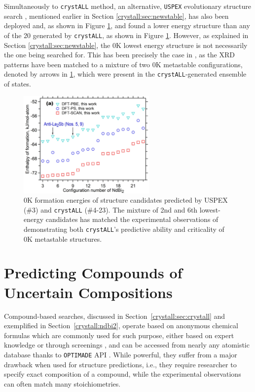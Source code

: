 Simultaneously to \texttt{crystALL} method, an alternative, \texttt{USPEX} evolutionary structure search \cite{Lyakhov2013NewUSPEX}, mentioned earlier in Section \ref{crystall:sec:newstable}, has also been deployed and, as shown in Figure \ref{crystall:fig:ndbi2dft}, and found a lower energy structure than any of the 20 generated by \texttt{crystALL}, as shown in Figure \ref{crystall:fig:ndbi2dft}. However, as explained in Section \ref{crystall:sec:newstable}, the 0K lowest energy structure is not necessarily the one being searched for. This has been precisely the case in \citet{Im2022ThermodynamicModeling}, as the XRD patterns have been matched to a mixture of two 0K metastable configurations, denoted by arrows in \ref{crystall:fig:ndbi2dft}, which were present in the \texttt{crystALL}-generated ensemble of states.

\begin{figure}[H]
    \centering
    \includegraphics[width=0.6\textwidth]{crystall/crystall_NdBi2dft.jpg}
    \caption{0K formation energies of structure candidates predicted by USPEX (\#3) and \texttt{crystALL} (\#4-23). The mixture of 2nd and 6th lowest-energy candidates has matched the experimental observations of  demonstrating both \texttt{crystALL}'s predictive ability and criticality of 0K metastable structures.}
    \label{crystall:fig:ndbi2dft}
\end{figure}


\section{Predicting Compounds of Uncertain Compositions} \label{sec:crystallcompositional}

Compound-based searches, discussed in Section~\ref{crystall:sec:crystall} and exemplified in Section~\ref{crystall:ndbi2}, operate based on anonymous chemical formulas which are commonly used for such purpose, either based on expert knowledge \cite{Mehl2016ThePrototypes} or through screenings \cite{Curtarolo2013AFLOW:Discovery, Schmidt2023, Ye2022NovelAgents}, and can be accessed from nearly any atomistic database thanks to \texttt{OPTIMADE} API \citet{Evans2024DevelopmentsExchange}. While powerful, they suffer from a major drawback when used for structure predictions, i.e., they require researcher to specify exact composition of a compound, while the experimental observations can often match many stoichiometries.

